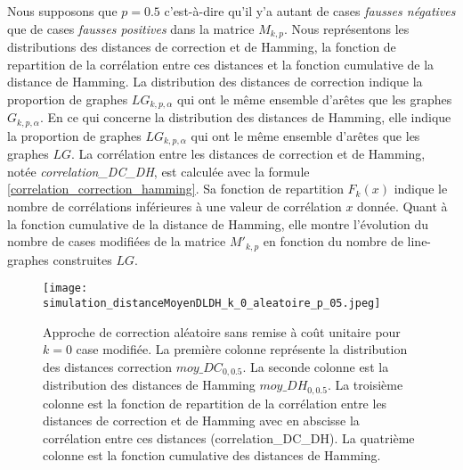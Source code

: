 

Nous supposons que $p=0.5$ c'est-\`a-dire qu'il y'a autant de cases {\em fausses n\'egatives} que de cases {\em fausses positives} dans la matrice $M_{k,p}$.
\newline
Nous repr\'esentons les distributions des distances de correction et de Hamming, la fonction de repartition de la corr\'elation entre ces distances  et la fonction cumulative de la distance de Hamming. 
La distribution des distances de correction indique la proportion de graphes $LG_{k,p,\alpha}$ qui ont le m\^eme ensemble d'ar\^etes que les graphes $G_{k,p,\alpha}$. En ce qui concerne la distribution des distances de Hamming, elle indique  la proportion de graphes $LG_{k,p,\alpha}$ qui ont le m\^eme ensemble d'ar\^etes que les graphes $LG$.
La corr\'elation entre les distances de correction et de Hamming, not\'ee {\em correlation\_DC\_DH}, est calcul\'ee avec la formule \ref{correlation_correction_hamming}. Sa fonction de repartition $F_k(x)$ indique le nombre de corr\'elations inf\'erieures \`a une valeur de corr\'elation $x$ donn\'ee.
Quant \`a la fonction cumulative de la distance de Hamming, elle montre l'\'evolution du nombre de cases modifi\'ees de la matrice $M'_{k,p}$ en fonction du nombre de line-graphes  construites $LG$.
\newline
\begin{figure}[htb!] 
\centering
\texttt{[image: simulation\_distanceMoyenDLDH\_k\_0\_aleatoire\_p\_05.jpeg]}
\caption{ Approche de correction al\'eatoire sans remise \`a co\^ut unitaire pour $k =0 $ case modifi\'ee. La premi\`ere colonne repr\'esente la distribution des distances correction $moy\_DC_{0,0.5}$. La seconde colonne est la distribution des distances de Hamming $moy\_DH_{0,0.5}$. La troisi\`eme colonne  est la fonction de repartition de la corr\'elation entre les distances de correction et de Hamming avec en abscisse la corr\'elation entre ces distances (correlation\_DC\_DH).  La quatri\`eme colonne est la fonction cumulative des distances de Hamming.}
\label{sansremise_unitaire_distanceMoyenDCDH_k_0_aleatoire_p_05} 
\end{figure}
\FloatBarrier

